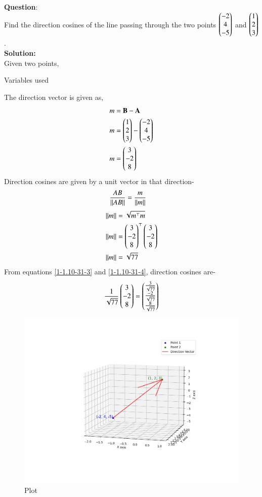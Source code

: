 \documentclass[journal]{IEEEtran}
\begin{document}
\textbf{Question}:\\
Find the direction cosines of the line passing through the two points $\begin{pmatrix}-2\\4\\-5\end{pmatrix}$ and $\begin{pmatrix}1\\2\\3\end{pmatrix}$.
\\
\textbf{Solution: }\\
Given two points,
\begin{table}[h!]    
  \centering
  
  \caption{Variables used}
  \label{1-1.10-31-table}
\end{table}
The direction vector is given as,
\begin{align}
    m&=\mathbf{B}-\mathbf{A}\label{1-1.10-31-1}\\
    m&=\begin{pmatrix}1\\2\\3\end{pmatrix}-\begin{pmatrix}-2\\4\\-5\end{pmatrix}\\
    m&=\begin{pmatrix}3\\-2\\8\end{pmatrix}\label{1-1.10-31-2}
\end{align}
Direction cosines are given by a unit vector in that direction-
\begin{align}
    \frac{AB}{\left\lVert AB\right\rVert}&=\frac{m}{\left\lVert m\right\rVert}\label{1-1.10-31-3}
\end{align}
 \begin{align}
    \left\lVert m\right\rVert&=\sqrt{m^\top m}\\
    \left\lVert m\right\rVert&=\begin{pmatrix}3\\-2\\8\end{pmatrix}^\top \begin{pmatrix}3\\-2\\8\end{pmatrix}\\
   \left\lVert m\right\rVert&=\sqrt{77}\label{1-1.10-31-4}
\end{align}
 From equations \eqref{1-1.10-31-3} and \eqref{1-1.10-31-4}, 
 direction cosines are-
\begin{align}
\frac{1}{\sqrt{77}}\begin{pmatrix}3\\-2\\8\end{pmatrix}=\begin{pmatrix}\frac{3}{\sqrt{77}}\\\frac{-2}{\sqrt{77}}\\\frac{8}{\sqrt{77}}\end{pmatrix}
\end{align}
\begin{figure}[h!]
   \centering
   \includegraphics[width=1.1\columnwidth]{Figs/Figure_1.png}
   \caption{Plot}
   \label{1-1.10-31-fig-1}
\end{figure}
\end{document}
